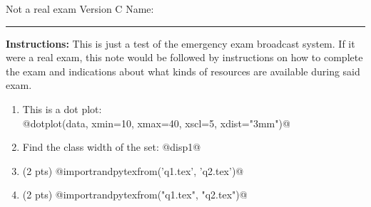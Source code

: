 \documentclass[12pt]{article}
\newcommand{\version}{C}
\begin{document}
\pagestyle{empty}

\noindent Not a real exam Version {\version} \hfill Name: \rule{6cm}{0.15mm} \vspace{2mm}

\begin{instructionbox}
    \textbf{Instructions:} This is just a test of the emergency exam broadcast system.
    If it were a real exam, this note would be followed by instructions on how to complete
    the exam and indications about what kinds of resources are available during said exam. 
\end{instructionbox}

\raggedright

\begin{enumerate}[1.]


\item This is a dot plot: \\[4mm]

@dotplot(data, xmin=10, xmax=40, xscl=5, xdist="3mm")@

%
%
%

\item

Find the class width of the set: @disp1@ \\[4cm]


\item (2 pts) @importrandpytexfrom('q1.tex', 'q2.tex')@

\item (2 pts) @importrandpytexfrom("q1.tex", "q2.tex")@



\vspace{3cm}



\end{enumerate}
\end{document}
